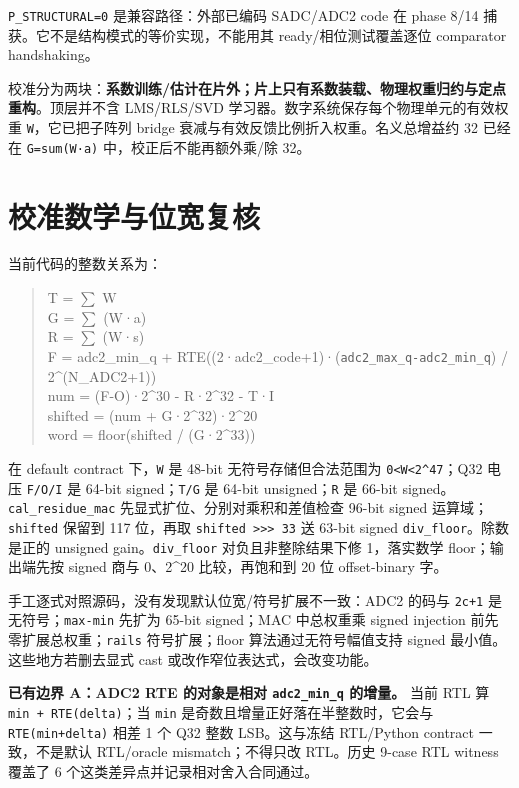 \documentclass[UTF8,fontset=fandol,10pt,a4paper,openany]{ctexrep}
\newcommand{\code}[1]{\nolinkurl{#1}}
\begin{document}
\code{P_STRUCTURAL=0} 是兼容路径：外部已编码 SADC/ADC2 code 在 phase 8/14 捕获。它不是结构模式的等价实现，不能用其 ready/相位测试覆盖逐位 comparator handshaking。


校准分为两块：\textbf{系数训练/估计在片外；片上只有系数装载、物理权重归约与定点重构}。顶层并不含 LMS/RLS/SVD 学习器。数字系统保存每个物理单元的有效权重 \code{W}，它已把子阵列 bridge 衰减与有效反馈比例折入权重。名义总增益约 32 已经在 \code{G=sum(W·a)} 中，校正后不能再额外乘/除 32。


\section{校准数学与位宽复核}


当前代码的整数关系为：


\begin{quote}\small\ttfamily\raggedright
T = \ensuremath{\sum} W\\G = \ensuremath{\sum} (W·a)\\R = \ensuremath{\sum} (W·s)\\F = adc2\_min\_q + RTE((2·adc2\_code+1)·(\code{adc2_max_q-adc2_min_q}) / 2\textasciicircum{}(N\_ADC2+1))\\num = (F-O)·2\textasciicircum{}30 - R·2\textasciicircum{}32 - T·I\\shifted = (num + G·2\textasciicircum{}32)·2\textasciicircum{}20\\word = floor(shifted / (G·2\textasciicircum{}33))
\end{quote}


在 default contract 下，\code{W} 是 48-bit 无符号存储但合法范围为 \code{0<W<2^47}；Q32 电压 \code{F/O/I} 是 64-bit signed；\code{T/G} 是 64-bit unsigned；\code{R} 是 66-bit signed。\code{cal_residue_mac} 先显式扩位、分别对乘积和差值检查 96-bit signed 运算域；\code{shifted} 保留到 117 位，再取 \code{shifted >>> 33} 送 63-bit signed \code{div_floor}。除数是正的 unsigned gain。\code{div_floor} 对负且非整除结果下修 1，落实数学 floor；输出端先按 signed 商与 0、2\textasciicircum{}20 比较，再饱和到 20 位 offset-binary 字。


手工逐式对照源码，没有发现默认位宽/符号扩展不一致：ADC2 的码与 \code{2c+1} 是无符号；\code{max-min} 先扩为 65-bit signed；MAC 中总权重乘 signed injection 前先零扩展总权重；\code{rails} 符号扩展；floor 算法通过无符号幅值支持 signed 最小值。这些地方若删去显式 cast 或改作窄位表达式，会改变功能。


\textbf{已有边界 A：ADC2 RTE 的对象是相对 \code{adc2_min_q} 的增量。} 当前 RTL 算 \code{min + RTE(delta)}；当 \code{min} 是奇数且增量正好落在半整数时，它会与 \code{RTE(min+delta)} 相差 1 个 Q32 整数 LSB。这与冻结 RTL/Python contract 一致，不是默认 RTL/oracle mismatch；不得只改 RTL。历史 9-case RTL witness 覆盖了 6 个这类差异点并记录相对舍入合同通过。
\end{document}
